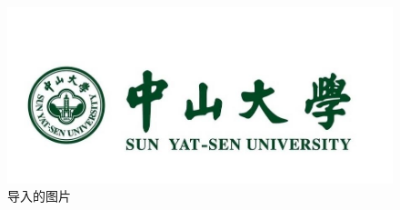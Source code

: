 \begin{figure}[h]
\centering
\includegraphics[scale = 0.5]{figures/sysu.jpeg}
\caption{导入的图片}
\label{fig1}
\end{figure}